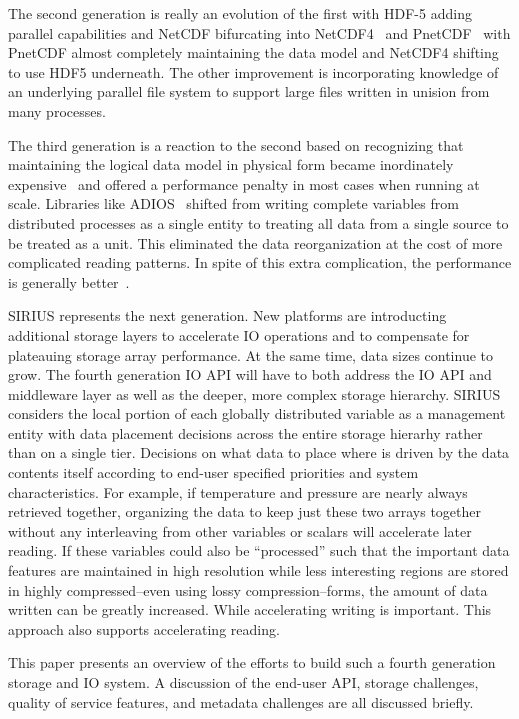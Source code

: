 \documentclass[letterpaper,twocolumn,10pt]{article}
\begin{document}
The second generation is really an evolution of the first with HDF-5 adding
parallel capabilities and NetCDF bifurcating into
NetCDF4~\cite{rew:2011:netcdf-guide} and PnetCDF~\cite{torrellas:2003:pnetcdf}
with PnetCDF almost completely maintaining the data model and NetCDF4 shifting
to use HDF5 underneath. The other improvement is incorporating knowledge of an
underlying parallel file system to support large files written in unision from
many processes.

The third generation is a reaction to the second based on recognizing that
maintaining the logical data model in physical form became inordinately
expensive~\cite{lofstead:2011:six-degrees} and offered a performance penalty in
most cases when running at scale. Libraries like
ADIOS~\cite{lofstead:2009:adaptable} shifted from writing complete variables
from distributed processes as a single entity to treating all data from a
single source to be treated as a unit. This eliminated the data reorganization
at the cost of more complicated reading patterns. In spite of this extra
complication, the performance is generally
better~\cite{lofstead:2011:six-degrees}.

SIRIUS represents the next generation. New platforms are introducting
additional storage layers to accelerate IO operations and to compensate for
plateauing storage array performance. At the same time, data sizes continue
to grow. The fourth generation IO API will have to both address the IO API
and middleware layer as well as the deeper, more complex storage hierarchy.
SIRIUS considers the local portion of each globally distributed variable as a
management entity with data placement decisions across the entire storage
hierarhy rather than on a single tier.  Decisions on what data to place where
is driven by the data contents itself according to end-user specified
priorities and system characteristics. For example, if temperature and pressure
are nearly always retrieved together, organizing the data to keep just these
two arrays together without any interleaving from other variables or scalars
will accelerate later reading. If these variables could also be ``processed''
such that the important data features are maintained in high resolution while
less interesting regions are stored in highly compressed--even using lossy
compression--forms, the amount of data written can be greatly increased. While
accelerating writing is important. This approach also supports accelerating
reading.

This paper presents an overview of the efforts to build such a fourth
generation storage and IO system. A discussion of the end-user API, storage
challenges, quality of service features, and metadata challenges are all
discussed briefly.
\end{document}

